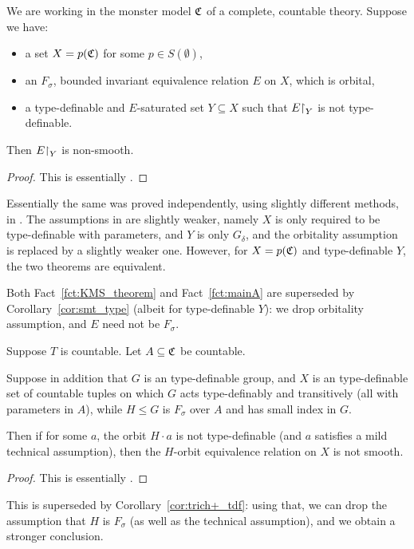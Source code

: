 	
	\begin{fct}\label{fct:mainA}
		We are working in the monster model ${\mathfrak C}$ of a complete, countable theory. Suppose we have:
		\begin{itemize}
			\item
			a set $X=p({\mathfrak C})$ for some $p\in S(\emptyset)$,
			\item
			an $F_\sigma$, bounded invariant equivalence relation $E$ on $X$, which is orbital,
			\item
			a type-definable and $E$-saturated set $Y\subseteq X$ such that $E\mathord{\upharpoonright}_Y$ is not type-definable.
		\end{itemize}
		Then $E\mathord{\upharpoonright}_Y$ is non-smooth.
	\end{fct}
	\begin{proof}
		This is essentially \cite[Theorem 3.4]{KR16}.
	\end{proof}
	
	Essentially the same was proved independently, using slightly different methods, in \cite[Theorem 3.17]{KM14}. The assumptions in \cite[Theorem 3.17]{KM14} are slightly weaker, namely $X$ is only required to be type-definable with parameters, and $Y$ is only $G_\delta$, and the orbitality assumption is replaced by a slightly weaker one. However, for $X=p({\mathfrak C})$ and type-definable $Y$, the two theorems are equivalent.
	
	Both Fact~\ref{fct:KMS_theorem} and Fact~\ref{fct:mainA} are superseded by Corollary~\ref{cor:smt_type} (albeit for type-definable $Y$): we drop orbitality assumption, and $E$ need not be $F_\sigma$.
	
	\begin{fct}
		Suppose $T$ is countable. Let $A\subseteq {\mathfrak C}$ be countable.
		
		Suppose in addition that $G$ is an type-definable group, and $X$ is an type-definable set of countable tuples on which $G$ acts type-definably and transitively (all with parameters in $A$), while $H\leq G$ is $F_\sigma$ over $A$ and has small index in $G$.
		
		Then if for some $a$, the orbit $H\cdot a$ is not type-definable (and $a$ satisfies a mild technical assumption), then the $H$-orbit equivalence relation on $X$ is not smooth.
	\end{fct}
	\begin{proof}
		This is essentially \cite[Theorem 3.33]{KM14}.
	\end{proof}
	This is superseded by Corollary~\ref{cor:trich+_tdf}: using that, we can drop the assumption that $H$ is $F_\sigma$ (as well as the technical assumption), and we obtain a stronger conclusion.
	
